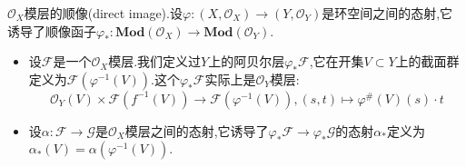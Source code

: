 $\mathscr{O}_X$模层的顺像(direct image).设$\varphi:(X,\mathscr{O}_X)\to(Y,\mathscr{O}_Y)$是环空间之间的态射,它诱导了顺像函子$\varphi_*:\textbf{Mod}(\mathscr{O}_X)\to\textbf{Mod}(\mathscr{O}_Y)$.
\begin{itemize}
	\item 设$\mathscr{F}$是一个$\mathscr{O}_X$模层.我们定义过$Y$上的阿贝尔层$\varphi_*\mathscr{F}$,它在开集$V\subset Y$上的截面群定义为$\mathscr{F}(\varphi^{-1}(V))$.这个$\varphi_*\mathscr{F}$实际上是$\mathscr{O}_Y$模层:
	$$\mathscr{O}_Y(V)\times\mathscr{F}(f^{-1}(V))\to\mathscr{F}(\varphi^{-1}(V)),(s,t)\mapsto\varphi^{\#}(V)(s)\cdot t$$
	\item 设$\alpha:\mathscr{F}\to\mathscr{G}$是$\mathscr{O}_X$模层之间的态射,它诱导了$\varphi_*\mathscr{F}\to\varphi_*\mathscr{G}$的态射$\alpha_*$定义为$\alpha_*(V)=\alpha(\varphi^{-1}(V))$.
\end{itemize}
